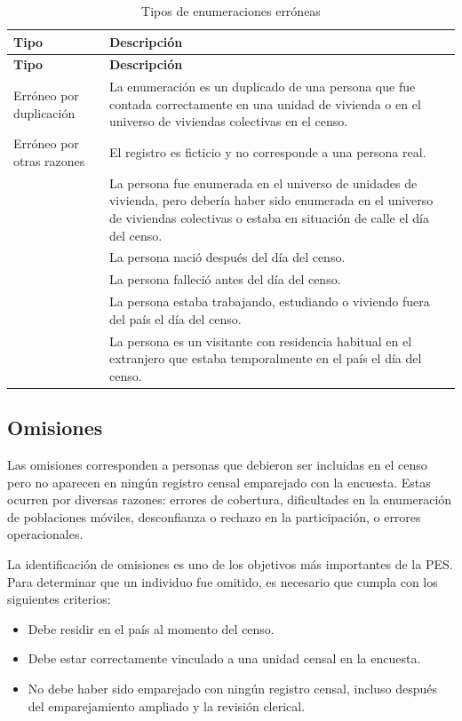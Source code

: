 \documentclass[
  12pt,
]{book}
\providecommand{\tightlist}{%
  \setlength{\itemsep}{0pt}\setlength{\parskip}{0pt}}
\begin{document}
\begin{longtable}[]{@{}ll@{}}
\caption{\label{tab:t1}Tipos de enumeraciones erróneas}\tabularnewline
\toprule\noalign{}
\textbf{Tipo} & \textbf{Descripción} \\
\midrule\noalign{}
\endfirsthead
\toprule\noalign{}
\textbf{Tipo} & \textbf{Descripción} \\
\midrule\noalign{}
\endhead
\bottomrule\noalign{}
\endlastfoot
Erróneo por duplicación & La enumeración es un duplicado de una persona que fue contada correctamente en una unidad de vivienda o en el universo de viviendas colectivas en el censo. \\
Erróneo por otras razones & El registro es ficticio y no corresponde a una persona real. \\
& La persona fue enumerada en el universo de unidades de vivienda, pero debería haber sido enumerada en el universo de viviendas colectivas o estaba en situación de calle el día del censo. \\
& La persona nació después del día del censo. \\
& La persona falleció antes del día del censo. \\
& La persona estaba trabajando, estudiando o viviendo fuera del país el día del censo. \\
& La persona es un visitante con residencia habitual en el extranjero que estaba temporalmente en el país el día del censo. \\
\end{longtable}

\subsection{Omisiones}\label{omisiones}

Las omisiones corresponden a personas que debieron ser incluidas en el censo pero no aparecen en ningún registro censal emparejado con la encuesta. Estas ocurren por diversas razones: errores de cobertura, dificultades en la enumeración de poblaciones móviles, desconfianza o rechazo en la participación, o errores operacionales.

La identificación de omisiones es uno de los objetivos más importantes de la PES. Para determinar que un individuo fue omitido, es necesario que cumpla con los siguientes criterios:

\begin{itemize}
\tightlist
\item
  Debe residir en el país al momento del censo.
\item
  Debe estar correctamente vinculado a una unidad censal en la encuesta.
\item
  No debe haber sido emparejado con ningún registro censal, incluso después del emparejamiento ampliado y la revisión clerical.
\end{itemize}
\end{document}
